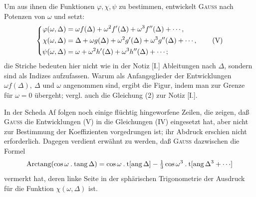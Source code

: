 \indent Um aus ihnen die Funktionen \(\varphi,\chi,\psi\) zu bestimmen, entwickelt \textsc{Gauss} nach Potenzen von \(\omega\) und setzt:
\begin{equation}
\left\{\begin{aligned}
\varphi(\omega,\Delta)&=\omega f(\Delta)+\omega^2 f'(\Delta)+\omega^3 f''(\Delta)+\mathinner{\cdotp\cdotp\cdotp},\\
\chi(\omega,\Delta)&=\Delta+\omega g(\Delta)+\omega^2 g'(\Delta)+\omega^3 g''(\Delta)+\mathinner{\cdotp\cdotp\cdotp},\\
\psi(\omega,\Delta)&=\omega+\omega^2 h'(\Delta)+\omega^3 h''(\Delta)+\mathinner{\cdotp\cdotp\cdotp};
\end{aligned}\right.\tag{V}
\end{equation}
\noindent die Striche bedeuten hier nicht wie in der Notiz [I.] Ableitungen nach \(\Delta\), sondern sind als Indizes aufzufassen. Warum als Anfangsglieder der Entwicklungen \(\omega f(\Delta),\ \Delta\) und \(\omega\) angenommen sind, ergibt die Figur, indem man zur Grenze für \(\omega=0\) übergeht; vergl. auch die Gleichung (2) zur Notiz [I.].

\indent In der Scheda Af folgen noch einige flüchtig hingeworfene Zeilen, die zeigen, daß \textsc{Gauss} die Entwicklungen (V) in die Gleichungen (IV) eingesetzt hat, aber nicht zur Bestimmung der Koeffizienten vorgedrungen ist; ihr Abdruck erschien nicht erforderlich. Dagegen verdient erwähnt zu werden, daß \textsc{Gauss} dazwischen die Formel
\[
\operatorname{Arctang}(\cos\omega\mathbin{.}\operatorname{tang}\Delta)=\cos\omega\mathbin{.}\operatorname{t}[\operatorname{ang}\Delta]-\tfrac13\cos\omega^3\mathbin{.}\operatorname{t}[\operatorname{ang}\Delta^3+\mathinner{\cdotp\cdotp\cdotp}]
\]
\noindent vermerkt hat, deren linke Seite in der sphärischen Trigonometrie der Ausdruck für die Funktion \(\chi(\omega,\Delta)\) ist.

